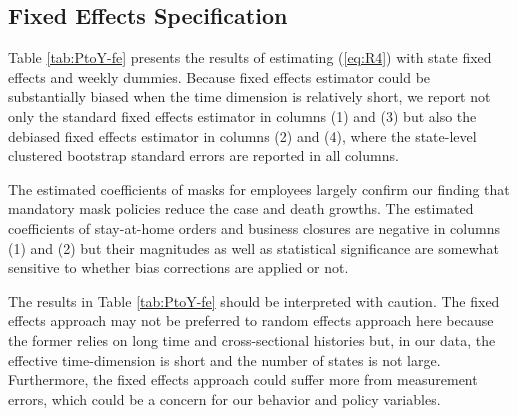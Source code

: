 \documentclass[3p, longtitle]{elsarticle}
\theoremstyle{definition}
\begin{document}
\subsection{Fixed Effects Specification}

Table \ref{tab:PtoY-fe} presents the results of estimating (\ref{eq:R4})  with  state fixed effects and weekly dummies.  Because fixed effects estimator could be substantially biased when the time dimension is relatively short, we report not only the standard fixed effects estimator in columns (1) and (3) but also the debiased fixed effects estimator \citep[e.g.,][]{chen2019mastering} in columns (2) and (4), where the state-level clustered bootstrap standard errors are reported in all columns.

The estimated coefficients of masks for employees largely confirm our finding that mandatory mask policies reduce the case and death growths. The estimated coefficients of stay-at-home orders and business closures are negative in columns (1) and (2) but their magnitudes as well as statistical significance are somewhat sensitive to whether bias corrections are applied or not. %

The results in Table \ref{tab:PtoY-fe} should be interpreted with caution. The fixed effects approach may not be preferred to random effects approach here because the former relies on long time and cross-sectional histories but, in our data, the effective time-dimension is short and the number of states is not large. Furthermore, the fixed effects approach could suffer more from  measurement errors, which could be a concern for our behavior and policy variables.
\end{document}
